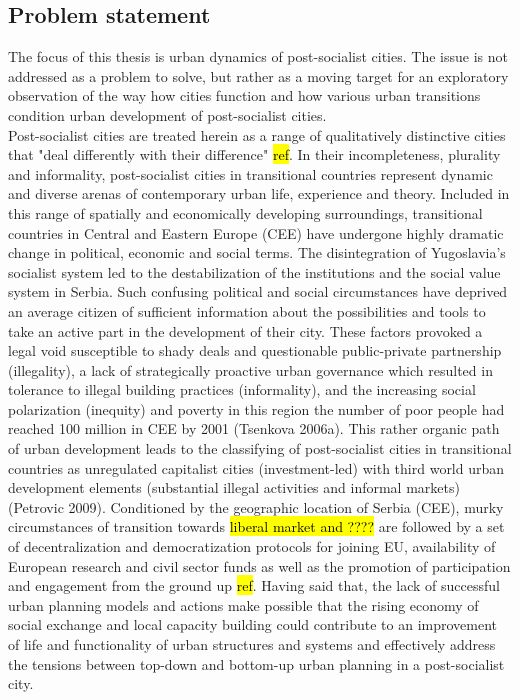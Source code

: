 \documentclass[11pt]{report}
\begin{document}
\subsection{Problem statement}
The focus of this thesis is urban dynamics of post-socialist cities. The issue is not addressed as a problem to solve, but rather as a moving target for an exploratory observation of the way how cities function and how various urban transitions condition urban development of post-socialist cities.
\\
Post-socialist cities are treated herein as a range of qualitatively distinctive cities that "deal differently with their difference" \hl{ref}. In their incompleteness, plurality and informality, post-socialist cities in transitional countries represent dynamic and diverse arenas of contemporary urban life, experience and theory. Included in this range of spatially and economically developing surroundings, transitional countries in Central and Eastern Europe (CEE) have undergone highly dramatic change in political, economic and social terms. The disintegration of Yugoslavia’s socialist system led to the destabilization of the institutions and the social value system in Serbia. Such confusing political and social circumstances have deprived an average citizen of sufficient information about the possibilities and tools to take an active part in the development of their city. These factors provoked a legal void susceptible to shady deals and questionable public-private partnership (illegality), a lack of strategically proactive urban governance which resulted in tolerance to illegal building practices (informality), and the increasing social polarization (inequity) and poverty in this region {the number of poor people had reached 100 million in CEE by 2001 (Tsenkova 2006a)}. This rather organic path of urban development leads to the classifying of post-socialist cities in transitional countries as unregulated capitalist cities (investment-led) with third world urban development elements (substantial illegal activities and informal markets) (Petrovic 2009). Conditioned by the geographic location of Serbia (CEE), murky circumstances of transition towards \hl{liberal market and ????} are followed by a set of decentralization and democratization protocols for joining EU, availability of European research and civil sector funds as well as the promotion of participation and engagement from the ground up \hl{ref}. Having said that, the lack of successful urban planning models and actions make possible that the rising economy of social exchange and local capacity building could contribute to an improvement of life and functionality of urban structures and systems and effectively address the tensions between top-down and bottom-up urban planning in a post-socialist city.
\end{document}
